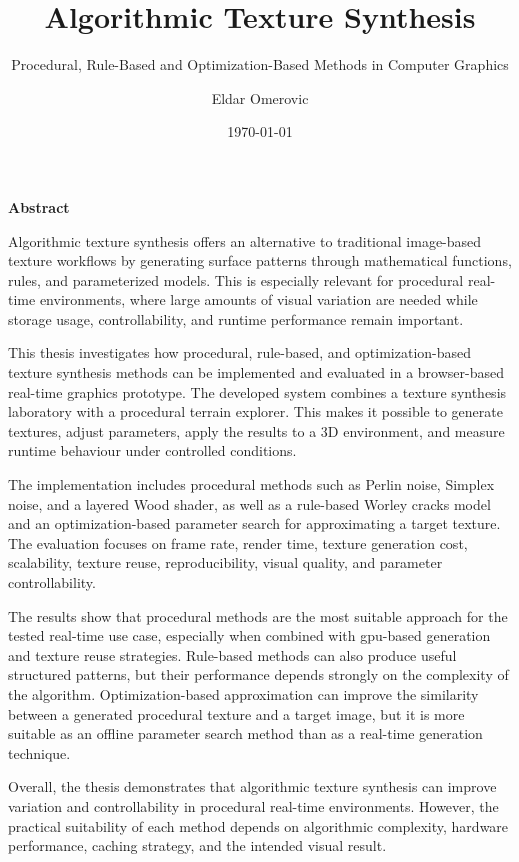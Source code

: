 \documentclass[%
  paper=a4,
  fontsize=11pt,
  BCOR=8mm,
  DIV=12,
  headings=normal,1
  parskip=half,
  numbers=noendperiod
]{scrreprt}
\title{Algorithmic Texture Synthesis}
\subtitle{Procedural, Rule-Based and Optimization-Based Methods in Computer Graphics}
\author{Eldar Omerovic}
\date{\today}
\begin{document}
\thispagestyle{empty}


\newpage

\setcounter{page}{1}  

\thispagestyle{empty}


\newpage
\vspace*{0.1\textheight}

\begin{center}
  {\large\bfseries Abstract\par}

  \vspace{0.5cm}

  Algorithmic texture synthesis offers an alternative to traditional image-based texture workflows by generating surface patterns through mathematical functions, rules, and parameterized models. This is especially relevant for procedural real-time environments, where large amounts of visual variation are needed while storage usage, controllability, and runtime performance remain important.

  This thesis investigates how procedural, rule-based, and optimization-based texture synthesis methods can be implemented and evaluated in a browser-based real-time graphics prototype. The developed system combines a texture synthesis laboratory with a procedural terrain explorer. This makes it possible to generate textures, adjust parameters, apply the results to a 3D environment, and measure runtime behaviour under controlled conditions.

  The implementation includes procedural methods such as Perlin noise, Simplex noise, and a layered Wood shader, as well as a rule-based Worley cracks model and an optimization-based parameter search for approximating a target texture. The evaluation focuses on frame rate, render time, texture generation cost, scalability, texture reuse, reproducibility, visual quality, and parameter controllability.

  The results show that procedural methods are the most suitable approach for the tested real-time use case, especially when combined with \gls{gpu}-based generation and texture reuse strategies. Rule-based methods can also produce useful structured patterns, but their performance depends strongly on the complexity of the algorithm. Optimization-based approximation can improve the similarity between a generated procedural texture and a target image, but it is more suitable as an offline parameter search method than as a real-time generation technique.

  Overall, the thesis demonstrates that algorithmic texture synthesis can improve variation and controllability in procedural real-time environments. However, the practical suitability of each method depends on algorithmic complexity, hardware performance, caching strategy, and the intended visual result.

\end{center}
\end{document}
